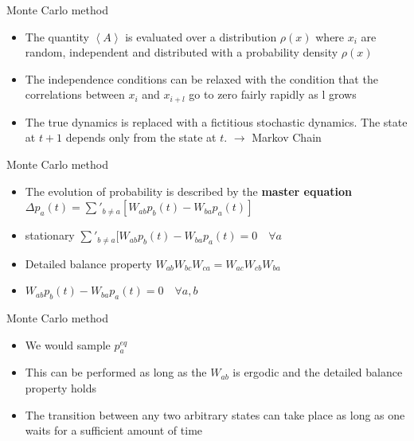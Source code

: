 \documentclass{beamer}
\begin{document}
\begin{frame}{Monte Carlo method \cite{peliti2011statistical}}

\begin{itemize}

\item The quantity $\left\langle  A\right\rangle $ is evaluated over a distribution $\rho(x)$ where $x_{i}$ are random,  independent and distributed with a probability density $\rho(x)$



\item The independence conditions can be relaxed with the condition that the correlations between $x_{i}$ and $x_{i+l}$ go to zero fairly rapidly as l grows 


\item The true dynamics is replaced with a fictitious stochastic dynamics.  The state at $t+1$ depends only from the state at $t$.  $\rightarrow$ Markov Chain 

\end{itemize}

\end{frame}

\begin{frame}{Monte Carlo method \cite{peliti2011statistical}}

\begin{itemize}

\item The evolution of probability is described by the \textbf{master equation} $\Delta p_{a}(t)=\sum'_{b\neq a}[W_{ab}p_{b}(t)-W_{ba}p_{a}(t)]$


\item stationary  \rightarrow $ \sum'_{b\neq a}[W_{ab}p_{b}(t)-W_{ba}p_{a}(t)=0\quad \forall a$


\item Detailed balance property $W_{ab}W_{bc}W_{ca}=W_{ac}W_{cb}W_{ba}$


\item $ W_{ab}p_{b}(t)-W_{ba}p_{a}(t)=0\quad \forall a,b$
\end{itemize}

\end{frame}


\begin{frame}{Monte Carlo method \cite{peliti2011statistical}}

\begin{itemize}

\item We would sample $p^{eq}_{a}$ 

\item This can be performed as long as the $W_{ab}$ is ergodic and the detailed balance property holds 

\item The transition between any two arbitrary states can take place as long as one waits for a sufficient amount of time

\end{itemize}

\end{frame}
\end{document}
